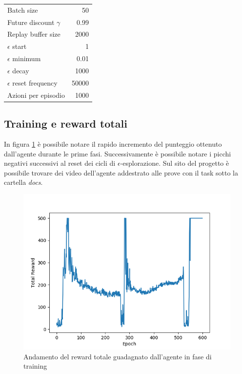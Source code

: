 \documentclass{article}
\begin{document}
		\begin{center}
		\begin{tabular}{l | r}
			Batch size & 50 \\
			Future discount $\gamma$ & 0.99 \\
			Replay buffer size & 2000 \\
			$\epsilon$ start & 1 \\
			$\epsilon$ minimum & 0.01 \\
			$\epsilon$ decay & 1000 \\
			$\epsilon$ reset frequency & 50000 \\
			Azioni per episodio & 1000 \\
		\end{tabular}
		\end{center}

	\subsection{Training e reward totali}
		In figura \ref{fig:rewards} è possibile notare il rapido incremento del punteggio ottenuto dall'agente durante le prime fasi. Successivamente è possibile notare i picchi negativi successivi al reset dei cicli di $\epsilon$-esplorazione. Sul sito del progetto \cite{git} è possibile trovare dei video dell'agente addestrato alle prove con il task sotto la cartella \textit{docs}.

		\begin{figure}[H]
			\centering
			\includegraphics[width=0.8\linewidth]{rewards.png}
			\caption{Andamento del reward totale guadagnato dall'agente in fase di training}
			\label{fig:rewards}
		\end{figure}

	\newpage
	{}
	
\end{document}
